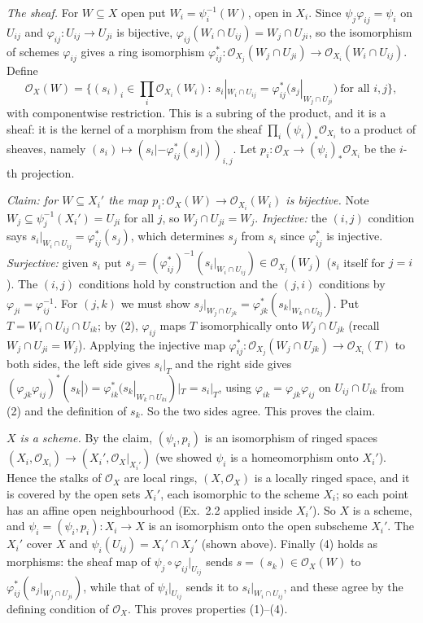 \documentclass[11pt]{article}
\begin{document}
\emph{The sheaf.} For $W\subseteq X$ open put $W_i=\psi_i^{-1}(W)$, open in $X_i$. Since $\psi_j\varphi_{ij}=\psi_i$ on $U_{ij}$ and $\varphi_{ij}:U_{ij}\to U_{ji}$ is bijective, $\varphi_{ij}(W_i\cap U_{ij})=W_j\cap U_{ji}$, so the isomorphism of schemes $\varphi_{ij}$ gives a ring isomorphism $\varphi_{ij}^*:\mathcal O_{X_j}(W_j\cap U_{ji})\to\mathcal O_{X_i}(W_i\cap U_{ij})$. Define
\[\mathcal O_X(W)=\bigl\{(s_i)_i\in\textstyle\prod_i\mathcal O_{X_i}(W_i):\ s_i|_{W_i\cap U_{ij}}=\varphi_{ij}^*\bigl(s_j|_{W_j\cap U_{ji}}\bigr)\ \text{for all }i,j\bigr\},\]
with componentwise restriction. This is a subring of the product, and it is a sheaf: it is the kernel of a morphism from the sheaf $\prod_i(\psi_i)_*\mathcal O_{X_i}$ to a product of sheaves, namely $(s_i)\mapsto(s_i|-\varphi_{ij}^*(s_j|))_{i,j}$. Let $p_i:\mathcal O_X\to(\psi_i)_*\mathcal O_{X_i}$ be the $i$-th projection.

\emph{Claim: for $W\subseteq X_i'$ the map $p_i:\mathcal O_X(W)\to\mathcal O_{X_i}(W_i)$ is bijective.} Note $W_j\subseteq\psi_j^{-1}(X_i')=U_{ji}$ for all $j$, so $W_j\cap U_{ji}=W_j$. \emph{Injective:} the $(i,j)$ condition says $s_i|_{W_i\cap U_{ij}}=\varphi_{ij}^*(s_j)$, which determines $s_j$ from $s_i$ since $\varphi_{ij}^*$ is injective. \emph{Surjective:} given $s_i$ put $s_j=(\varphi_{ij}^*)^{-1}(s_i|_{W_i\cap U_{ij}})\in\mathcal O_{X_j}(W_j)$ ($s_i$ itself for $j=i$). The $(i,j)$ conditions hold by construction and the $(j,i)$ conditions by $\varphi_{ji}=\varphi_{ij}^{-1}$. For $(j,k)$ we must show $s_j|_{W_j\cap U_{jk}}=\varphi_{jk}^*(s_k|_{W_k\cap U_{kj}})$. Put $T=W_i\cap U_{ij}\cap U_{ik}$; by (2), $\varphi_{ij}$ maps $T$ isomorphically onto $W_j\cap U_{jk}$ (recall $W_j\cap U_{ji}=W_j$). Applying the injective map $\varphi_{ij}^*:\mathcal O_{X_j}(W_j\cap U_{jk})\to\mathcal O_{X_i}(T)$ to both sides, the left side gives $s_i|_T$ and the right side gives $(\varphi_{jk}\varphi_{ij})^*(s_k|)=\varphi_{ik}^*(s_k|_{W_k\cap U_{ki}})|_T=s_i|_T$, using $\varphi_{ik}=\varphi_{jk}\varphi_{ij}$ on $U_{ij}\cap U_{ik}$ from (2) and the definition of $s_k$. So the two sides agree. This proves the claim.

\emph{$X$ is a scheme.} By the claim, $(\psi_i,p_i)$ is an isomorphism of ringed spaces $(X_i,\mathcal O_{X_i})\to(X_i',\mathcal O_X|_{X_i'})$ (we showed $\psi_i$ is a homeomorphism onto $X_i'$). Hence the stalks of $\mathcal O_X$ are local rings, $(X,\mathcal O_X)$ is a locally ringed space, and it is covered by the open sets $X_i'$, each isomorphic to the scheme $X_i$; so each point has an affine open neighbourhood (Ex.~2.2 applied inside $X_i'$). So $X$ is a scheme, and $\psi_i=(\psi_i,p_i):X_i\to X$ is an isomorphism onto the open subscheme $X_i'$. The $X_i'$ cover $X$ and $\psi_i(U_{ij})=X_i'\cap X_j'$ (shown above). Finally (4) holds as morphisms: the sheaf map of $\psi_j\circ\varphi_{ij}|_{U_{ij}}$ sends $s=(s_k)\in\mathcal O_X(W)$ to $\varphi_{ij}^*(s_j|_{W_j\cap U_{ji}})$, while that of $\psi_i|_{U_{ij}}$ sends it to $s_i|_{W_i\cap U_{ij}}$, and these agree by the defining condition of $\mathcal O_X$. This proves properties (1)--(4).
\end{document}
